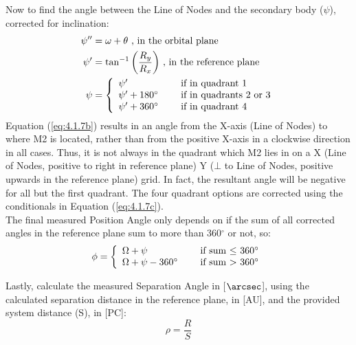 \documentclass[12pt,preprint]{aastex}
\begin{document}
Now to find the angle between the Line of Nodes and the secondary body ($\psi$), corrected for inclination:
\begin{subequations}
\begin{align}
\label{eq:4.1.7a}
\psi^{\prime \prime}& = \omega + \theta \text{ , in the orbital plane}\\
\label{eq:4.1.7b}
\psi^{\prime}& = \tan^{-1} \bigg( \frac{R_y}{R_x} \bigg) \text{ , in the reference plane}\\
\label{eq:4.1.7c}
\psi& = \left\{ \begin{array}{l l l} \psi^{\prime}& \quad \text{ if in quadrant 1}\\ \psi^{\prime} + 180^{\circ}& \quad \text{ if in quadrants 2 or 3}\\ \psi^{\prime} + 360^{\circ}& \quad \text{ if in quadrant 4} \end{array}\right.
\end{align}
\end{subequations}
Equation (\ref{eq:4.1.7b}) results in an angle from the X-axis (Line of Nodes) to where M2
is located, rather than from the positive X-axis in a clockwise direction in all
cases.  Thus, it is not always in the quadrant which M2 lies in on a X (Line of Nodes, positive to right in reference plane) Y ($\bot$ to Line of Nodes, positive upwards in the reference plane) grid.  In fact, the resultant angle will be negative for all but the first quadrant.  The four quadrant options are corrected using the conditionals in Equation (\ref{eq:4.1.7c}).\\

The final measured Position Angle only depends on if the sum of all corrected angles in the reference plane sum to more than 360$^{\circ}$ or not, so:
\begin{equation}\label{eq:4.1.8}
\phi= \left\{ \begin{array}{l l} \Omega + \psi& \quad \text{ if sum $\le$ 360$^{\circ}$}\\ \Omega + \psi - 360^{\circ}& \quad \text{ if sum $>$ 360$^{\circ}$}\\ \end{array} \right.
\end{equation}

Lastly, calculate the measured Separation Angle in [$\arcsec$], using the calculated separation distance in the reference plane, in [AU], and the provided system distance (S), in [PC]:
\begin{equation}\label{eq:4.1.9}
\rho= \frac{R}{S}
\end{equation}
\end{document}
